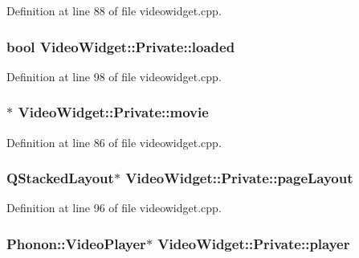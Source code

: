 Definition at line 88 of file videowidget.\+cpp.

\hypertarget{classVideoWidget_1_1Private_a56cd47cb3f67303c324c1141de5f8068}{
\subsubsection[{loaded}]{\setlength{\rightskip}{0pt plus 5cm}bool Video\+Widget\+::\+Private\+::loaded}}\label{classVideoWidget_1_1Private_a56cd47cb3f67303c324c1141de5f8068}


Definition at line 98 of file videowidget.\+cpp.

\hypertarget{classVideoWidget_1_1Private_a500f2a0b237f083a573b689a1bb0a90a}{
\subsubsection[{movie}]{$\ast$ Video\+Widget\+::\+Private\+::movie}}\label{classVideoWidget_1_1Private_a500f2a0b237f083a573b689a1bb0a90a}


Definition at line 86 of file videowidget.\+cpp.

\hypertarget{classVideoWidget_1_1Private_afcb2f757498947705dafb8305e0fb0bc}{
\subsubsection[{page\+Layout}]{\setlength{\rightskip}{0pt plus 5cm}Q\+Stacked\+Layout$\ast$ Video\+Widget\+::\+Private\+::page\+Layout}}\label{classVideoWidget_1_1Private_afcb2f757498947705dafb8305e0fb0bc}


Definition at line 96 of file videowidget.\+cpp.

\hypertarget{classVideoWidget_1_1Private_ad25b2b9ba312490e52b2c21861aceaa1}{
\subsubsection[{player}]{\setlength{\rightskip}{0pt plus 5cm}Phonon\+::\+Video\+Player$\ast$ Video\+Widget\+::\+Private\+::player}}\label{classVideoWidget_1_1Private_ad25b2b9ba312490e52b2c21861aceaa1}


